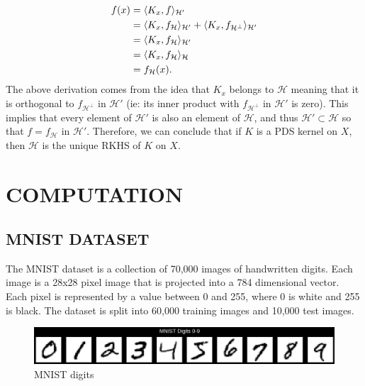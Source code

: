 \documentclass[12pt]{article}
\begin{document}
\begin{enumerate}[topsep=0pt, partopsep=0pt, itemsep=0pt, label=(\roman*)]
\begin{align*}
            f(x) &= \langle K_x,f\rangle_{\mathcal{H}'} \\
            &= \langle K_x,f_{\mathcal{H}}\rangle_{\mathcal{H}'} + \langle K_x,f_{\mathcal{H}^\perp}\rangle_{\mathcal{H}'} \\
            &= \langle K_x,f_{\mathcal{H}}\rangle_{\mathcal{H}'} \\
            &= \langle K_x,f_{\mathcal{H}}\rangle_{\mathcal{H}} \\
            &= f_{\mathcal{H}}(x).
        \end{align*}
        The above derivation comes from the idea that $K_x$ belongs to $\mathcal{H}$ meaning that it is orthogonal to
        $f_{\mathcal{H}^\perp}$ in $\mathcal{H}'$ (ie: its inner product with $f_{\mathcal{H}^\perp}$ in $\mathcal{H}'$ is zero).
        This implies that every element of $\mathcal{H}'$ is also an element of $\mathcal{H}$, and thus 
        $\mathcal{H}' \subset \mathcal{H}$ so that $f=f_\mathcal{H}$ in $\mathcal{H}'$. Therefore, we can conclude that
        if $K$ is a PDS kernel on $X$, then $\mathcal{H}$ is the unique RKHS of $K$ on $X$.


\end{enumerate}
\newpage

\section*{COMPUTATION}

\subsection*{MNIST DATASET}
The MNIST dataset is a collection of 70,000 images of handwritten digits. Each image is a 28x28 pixel image  that is 
projected into a 784 dimensional vector. Each pixel is represented by a value between 0 and 255, where 0 is white and 255 is black.
The dataset is split into 60,000 training images and 10,000 test images. \\
\begin{figure}[h!]
    \centering
    \includegraphics[scale=0.4]{mnist-digits.png}
\caption{MNIST digits}
\label{fig:mnist}
\end{figure}
\end{document}

